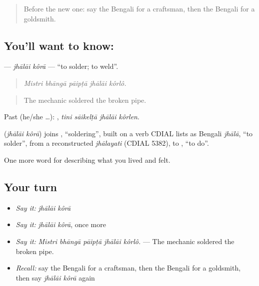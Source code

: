 \label{lesson:BN-C492-jhalai-kora}



\begin{quote}
Before the new one: say the Bengali for a craftsman, then the Bengali for a goldsmith.
\end{quote}

\subsection*{You'll want to know:  }
\textbf{ } — \emph{jhālāi kôrā} — \textquotedblleft{}to solder; to weld\textquotedblright{}.

\begin{quote}
    
\end{quote}

\begin{quote}
\emph{Mistri bhāngā pāipṭā jhālāi kôrlô.}
\end{quote}

\begin{quote}
The mechanic soldered the broken pipe.
\end{quote}

Past (he/she …):    , \emph{tini sāikelṭā jhālāi kôrlen}.

\begin{cousinweb}
\textbf{ } (\emph{jhālāi kôrā}) joins , \textquotedblleft{}soldering\textquotedblright{}, built on a verb CDIAL lists as Bengali \emph{jhālā}, \textquotedblleft{}to solder\textquotedblright{}, from a reconstructed \emph{jhālayati} (CDIAL 5382), to , \textquotedblleft{}to do\textquotedblright{}.
\end{cousinweb}

\begin{grammarlens}[title={What you've built}]
One more word for describing what you lived and felt.
\end{grammarlens}

\subsection*{Your turn}
\begin{itemize}
\raggedright
  \item \emph{Say it:} \emph{jhālāi kôrā}
  \item \emph{Say it:} \emph{jhālāi kôrā}, once more
  \item \emph{Say it:} \emph{Mistri bhāngā pāipṭā jhālāi kôrlô.} — The mechanic soldered the broken pipe.
  \item \emph{Recall:} say the Bengali for a craftsman, then the Bengali for a goldsmith, then say \emph{jhālāi kôrā} again
\end{itemize}

